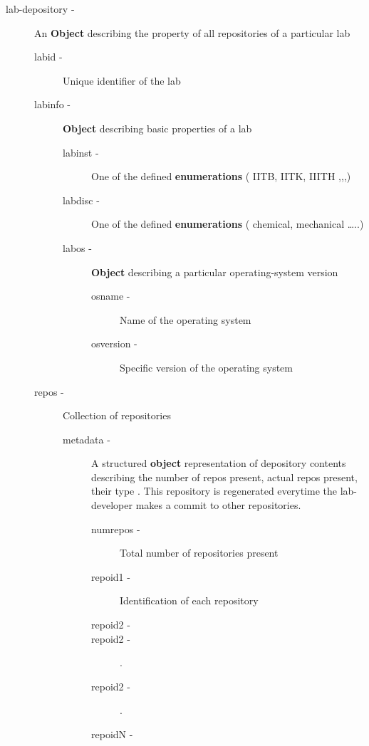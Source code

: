 \documentclass[11pt]{article}
\begin{document}
\begin{description}
\item [lab-depository -] An \textbf{Object} describing the property of all
                    repositories of a particular lab

\begin{description}
\item [labid -] Unique identifier of the lab
\item [labinfo -] \textbf{Object} describing basic properties of a lab

\begin{description}
\item [labinst -] One of the defined \textbf{enumerations} ( IITB, IITK, IIITH ,,,)
\item [labdisc -] One of the defined \textbf{enumerations} ( chemical, mechanical \ldots{}..)
\item [labos -] \textbf{Object} describing a particular operating-system version

\begin{description}
\item [osname -] Name of the operating system
\item [osversion -] Specific version of the operating system
\end{description}

\end{description}

\item [repos -] Collection of repositories

\begin{description}
\item [metadata -]  A structured \textbf{object} representation of
                           depository contents describing the number
                           of repos present, actual repos present,
                           their type . This repository is regenerated
                           everytime the lab-developer makes a commit
                           to other repositories.

\begin{description}
\item [numrepos -] Total number of repositories present
\item [repoid1 -] Identification of each repository
\item [repoid2 -]
\item [repoid2 -].
\item [repoid2 -].
\item [repoidN -]
\end{description}


\end{description}
\end{description}
\end{description}
\end{document}
